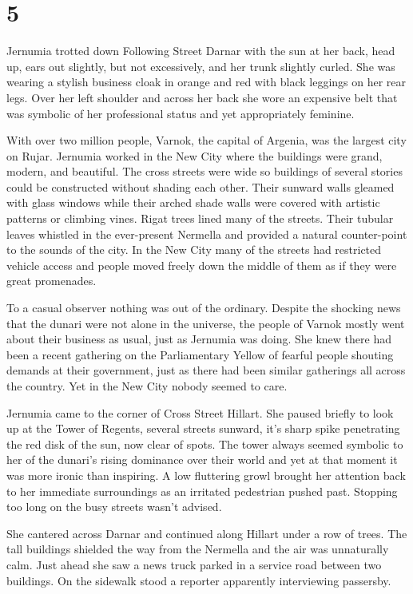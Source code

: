 
\chapter{5}

Jernumia trotted down Following Street Darnar with the sun at her back, head up, ears out
slightly, but not excessively, and her trunk slightly curled. She was wearing a stylish business
cloak in orange and red with black leggings on her rear legs. Over her left shoulder and across
her back she wore an expensive belt that was symbolic of her professional status and yet
appropriately feminine.

With over two million people, Varnok, the capital of Argenia, was the largest city on Rujar.
Jernumia worked in the New City where the buildings were grand, modern, and beautiful. The cross
streets were wide so buildings of several stories could be constructed without shading each
other. Their sunward walls gleamed with glass windows while their arched shade walls were
covered with artistic patterns or climbing vines. Rigat trees lined many of the streets. Their
tubular leaves whistled in the ever-present Nermella and provided a natural counter-point to the
sounds of the city. In the New City many of the streets had restricted vehicle access and people
moved freely down the middle of them as if they were great promenades.

To a casual observer nothing was out of the ordinary. Despite the shocking news that the dunari
were not alone in the universe, the people of Varnok mostly went about their business as usual,
just as Jernumia was doing. She knew there had been a recent gathering on the Parliamentary
Yellow of fearful people shouting demands at their government, just as there had been similar
gatherings all across the country. Yet in the New City nobody seemed to care.

Jernumia came to the corner of Cross Street Hillart. She paused briefly to look up at the Tower
of Regents, several streets sunward, it's sharp spike penetrating the red disk of the sun, now
clear of spots. The tower always seemed symbolic to her of the dunari's rising dominance over
their world and yet at that moment it was more ironic than inspiring. A low fluttering growl
brought her attention back to her immediate surroundings as an irritated pedestrian pushed past.
Stopping too long on the busy streets wasn't advised.

She cantered across Darnar and continued along Hillart under a row of trees. The tall buildings
shielded the way from the Nermella and the air was unnaturally calm. Just ahead she saw a news
truck parked in a service road between two buildings. On the sidewalk stood a reporter
apparently interviewing passersby.

